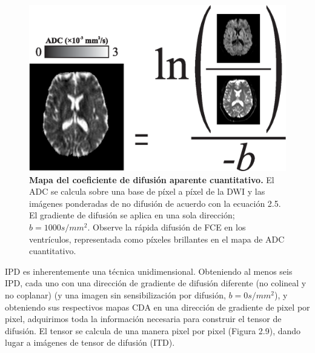 \documentclass[12pt,a5,twoside]{book}
\begin{document}
\begin{figure}
	\centering
    \includegraphics [scale=0.9,center] {DTI_ADCmaps.eps}
    \caption{\textbf{Mapa del coeficiente de difusión aparente cuantitativo. } El ADC se calcula sobre una base de píxel a píxel de la DWI y las imágenes ponderadas de no difusión de acuerdo con la ecuación 2.5. El gradiente de difusión se aplica en una sola dirección; $b = 1000 s/mm^{2}$. Observe la rápida difusión de FCE en los ventrículos, representada como píxeles brillantes en el mapa de ADC cuantitativo.}
    \label{F:DTI_ADCmaps}
\end{figure}

IPD es inherentemente una técnica unidimensional. Obteniendo al menos seis IPD, cada uno con una dirección de gradiente de difusión diferente (no colineal y no coplanar) (y una imagen sin sensibilización por difusión, $b = 0 s/mm^{2}$), y obteniendo sus respectivos mapas CDA en una dirección de gradiente de pixel por pixel, adquirimos toda la información necesaria para construir el tensor de difusión. El tensor se calcula de una manera pixel por pixel (Figura 2.9), dando lugar a imágenes de tensor de difusión (ITD).
\end{document}
